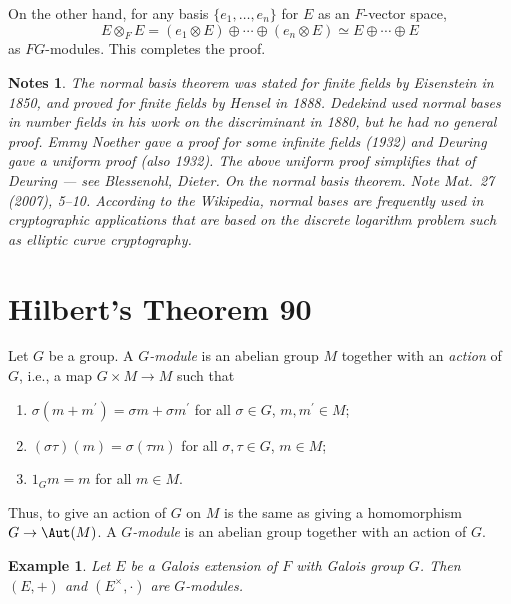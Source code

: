 \documentclass[a4paper,11pt,final,openany]{memoir}
\newtheorem{example}[X]{Example}
\newtheorem*{nt}{Notes}
\theoremstyle{nonumberplain}
\begin{document}
On the other hand, for any basis $\{e_{1},\ldots,e_{n}\}$ for $E$ as an
$F$-vector space,
\[
E\otimes_{F}E=(e_{1}\otimes E)\oplus\cdots\oplus(e_{n}\otimes E)\simeq
E\oplus\cdots\oplus E
\]
as $FG$-modules. This completes the proof.

\begin{nt}
The normal basis theorem was stated for finite fields by Eisenstein in 1850,
and proved for finite fields by Hensel in 1888. Dedekind used normal bases in
number fields in his work on the discriminant in 1880, but he had no general
proof. Emmy Noether gave a proof for some infinite fields (1932) and Deuring
gave a uniform proof (also 1932). The above uniform proof simplifies that of
Deuring --- see Blessenohl, Dieter. On the normal basis theorem. Note Mat.~27
(2007), 5--10. According to the Wikipedia, normal bases are frequently used in
cryptographic applications that are based on the discrete logarithm problem
such as elliptic curve cryptography.
\end{nt}

\section{Hilbert's Theorem 90}

Let $G$ be a group. A $G$\emph{-module\/}%
is an abelian group $M$ together with an
%
\emph{action} of $G$, i.e., a map $G\times M\rightarrow M$ such that

\begin{enumerate}
\item $\sigma(m+m^{\prime})=\sigma m+\sigma m^{\prime}$ for all $\sigma\in G$,
$m,m^{\prime}\in M$;

\item $(\sigma\tau)(m)=\sigma(\tau m)$ for all $\sigma,\tau\in G$, $m\in M$;

\item $1_{G}m=m$ for all $m\in M$.
\end{enumerate}

\noindent Thus, to give an action of $G$ on $M$ is the same as giving a
homomorphism $G\rightarrow\Aut(M)$. A
%
$G$\emph{-module} is an abelian group together with an action of $G$.

\begin{example}
\label{ag15}Let $E$ be a Galois extension of $F$ with Galois group $G$. Then
$(E,+)$ and $(E^{\times},\cdot)$ are $G$-modules.
\end{example}
\end{document}
